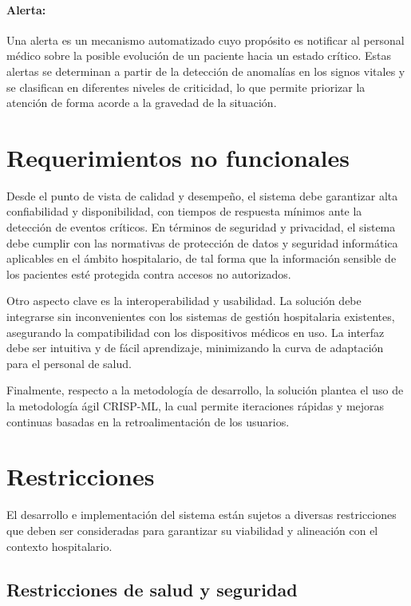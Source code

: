 \paragraph{Alerta:} Una alerta es un mecanismo automatizado cuyo propósito es notificar al personal médico sobre la posible evolución de un paciente hacia un estado crítico. Estas alertas se determinan a partir de la detección de anomalías en los signos vitales y se clasifican en diferentes niveles de criticidad, lo que permite priorizar la atención de forma acorde a la gravedad de la situación.

\section{Requerimientos no funcionales}

Desde el punto de vista de calidad y desempeño, el sistema debe garantizar alta confiabilidad y disponibilidad, con tiempos de respuesta mínimos ante la detección de eventos críticos. En términos de seguridad y privacidad, el sistema debe cumplir con las normativas de protección de datos y seguridad informática aplicables en el ámbito hospitalario, de tal forma que la información sensible de los pacientes esté protegida contra accesos no autorizados.

Otro aspecto clave es la interoperabilidad y usabilidad. La solución debe integrarse sin inconvenientes con los sistemas de gestión hospitalaria existentes, asegurando la compatibilidad con los dispositivos médicos en uso. La interfaz debe ser intuitiva y de fácil aprendizaje, minimizando la curva de adaptación para el personal de salud.

Finalmente, respecto a la metodología de desarrollo, la solución plantea el uso de la metodología ágil CRISP-ML, la cual permite iteraciones rápidas y mejoras continuas basadas en la retroalimentación de los usuarios.

\medskip

\section{Restricciones}

El desarrollo e implementación del sistema están sujetos a diversas restricciones que deben ser consideradas para garantizar su viabilidad y alineación con el contexto hospitalario.

\medskip

\subsection{Restricciones de salud y seguridad}

